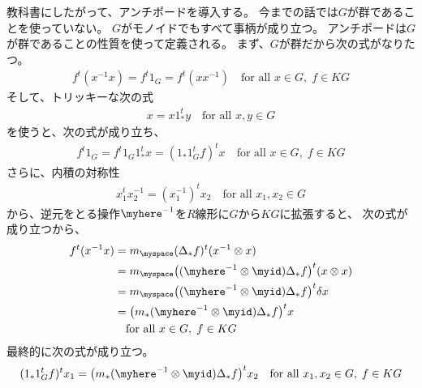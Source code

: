 	教科書\cite{bk:jinbo.ryousigun}にしたがって、アンチポードを導入する。
	今までの話では$G$が群であることを使っていない。
	$G$がモノイドでもすべて事柄が成り立つ。
	アンチポードは$G$が群であることの性質を使って定義される。
	まず、$G$が群だから次の式がなりたつ。
	\begin{equation}\label{eq:群のアンチポードの定義式}\begin{split} %
		f^t(x^{-1}x) = f^t1_G = f^t(xx^{-1})
		\quad\text{for all }x\in G,\; f\in KG
	\end{split}\end{equation} %
	そして、トリッキーな次の式
	\begin{equation*}\begin{split} %
		x = x1_*^ty \quad\text{for all }x,y\in G
	\end{split}\end{equation*} %
	を使うと、次の式が成り立ち、
	\begin{equation*}\begin{split} %
		f^t1_G = f^t1_G1_*^t x = (1_*1_G^tf)^t x 
			\quad\text{for all }x\in G,\; f\in KG
	\end{split}\end{equation*} %
	さらに、内積の対称性
	\begin{equation*}\begin{split} %
		x_1^tx_2^{-1} = (x_1^{-1})^tx_2 \quad\text{for all }x_1,x_2\in G
	\end{split}\end{equation*} %
	から、逆元をとる操作$\myhere^{-1}$を$R$線形に$G$から$KG$に拡張すると、
	次の式が成り立つから、
	\begin{equation*}\begin{split} %
		f^t(x^{-1}x) &= m_\myspace(\Delta_*f)^t(x^{-1}\otimes x) \\
		&= m_\myspace\bigl((\myhere^{-1}\otimes\myid)\Delta_*f\bigr)^t
			(x\otimes x) \\
		&= m_\myspace\bigl((\myhere^{-1}\otimes\myid)\Delta_*f\bigr)^t
			\delta x \\
		&= \bigl(m_*(\myhere^{-1}\otimes\myid)\Delta_*f\bigr)^tx \\
		&\quad\text{for all }x\in G,\;f\in KG
	\end{split}\end{equation*} %
	最終的に次の式が成り立つ。
	\begin{equation*}\begin{split} %
		(1_*1_G^tf)^tx_1
		= \bigl(m_*(\myhere^{-1}\otimes\myid)\Delta_*f\bigr)^tx_2 
		\quad\text{for all }x_1,x_2\in G,\; f\in KG
	\end{split}\end{equation*} %
